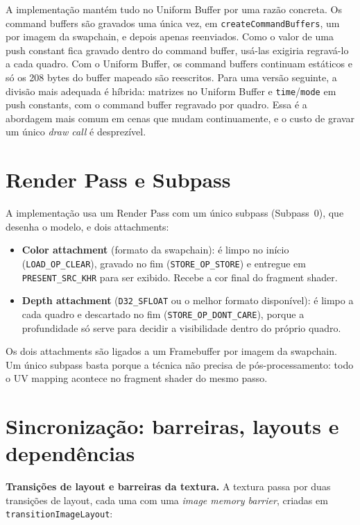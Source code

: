 A implementação mantém tudo no Uniform Buffer por uma razão concreta. Os command buffers são gravados uma única vez, em \texttt{createCommandBuffers}, um por imagem da swapchain, e depois apenas reenviados. Como o valor de uma push constant fica gravado dentro do command buffer, usá-las exigiria regravá-lo a cada quadro. Com o Uniform Buffer, os command buffers continuam estáticos e só os 208 bytes do buffer mapeado são reescritos. Para uma versão seguinte, a divisão mais adequada é híbrida: matrizes no Uniform Buffer e \texttt{time}/\texttt{mode} em push constants, com o command buffer regravado por quadro. Essa é a abordagem mais comum em cenas que mudam continuamente, e o custo de gravar um único \textit{draw call} é desprezível.

\section{Render Pass e Subpass}

A implementação usa um Render Pass com um único subpass (Subpass~0), que desenha o modelo, e dois attachments:
\begin{itemize}
    \item \textbf{Color attachment} (formato da swapchain): é limpo no início (\texttt{LOAD\_OP\_CLEAR}), gravado no fim (\texttt{STORE\_OP\_STORE}) e entregue em \texttt{PRESENT\_SRC\_KHR} para ser exibido. Recebe a cor final do fragment shader.
    \item \textbf{Depth attachment} (\texttt{D32\_SFLOAT} ou o melhor formato disponível): é limpo a cada quadro e descartado no fim (\texttt{STORE\_OP\_DONT\_CARE}), porque a profundidade só serve para decidir a visibilidade dentro do próprio quadro.
\end{itemize}
Os dois attachments são ligados a um Framebuffer por imagem da swapchain. Um único subpass basta porque a técnica não precisa de pós-processamento: todo o UV mapping acontece no fragment shader do mesmo passo.

\section{Sincronização: barreiras, layouts e dependências}

\textbf{Transições de layout e barreiras da textura.} A textura passa por duas transições de layout, cada uma com uma \textit{image memory barrier}, criadas em \texttt{transitionImageLayout}:

